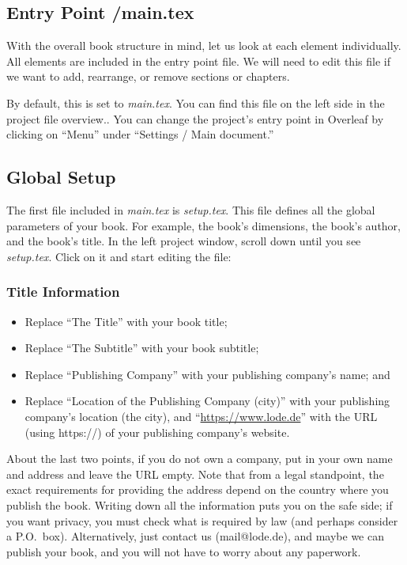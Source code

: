 \subsection{Entry Point /main.tex}\label{entrypoint:sec}

With the overall book structure in mind, let us look at each element individually. All elements are included in the entry point file. We will need to edit this file if we want to add, rearrange, or remove sections or chapters.

By default, this is set to \textit{main.tex}. You can find this file on the left side in the project file overview.. You can change the project's entry point in Overleaf by clicking on ``Menu'' under ``Settings / Main document.'' 


\subsection{Global Setup}\label{globalsetup:sec}

The first file included in \textit{main.tex} is \textit{setup.tex}. This file defines all the global parameters of your book. For example, the book's dimensions, the book's author, and the book's title. In the left project window, scroll down until you see \textit{setup.tex}. Click on it and start editing the file:


\subsubsection{Title Information}

\begin{itemize}
\item Replace ``The Title'' with your book title;
\item Replace ``The Subtitle'' with your book subtitle;
\item Replace ``Publishing Company'' with your publishing company's name; and
\item Replace ``Location of the Publishing Company (city)'' with your publishing company's location (the city), and ``\url{https://www.lode.de}'' with the URL (using https://) of your publishing company's website.
\end{itemize}

About the last two points, if you do not own a company, put in your own name and address and leave the URL empty. Note that from a legal standpoint, the exact requirements for providing the address depend on the country where you publish the book. Writing down all the information puts you on the safe side; if you want privacy, you must check what is required by law (and perhaps consider a P.O.~box). Alternatively, just contact us (mail@lode.de), and maybe we can publish your book, and you will not have to worry about any paperwork.


